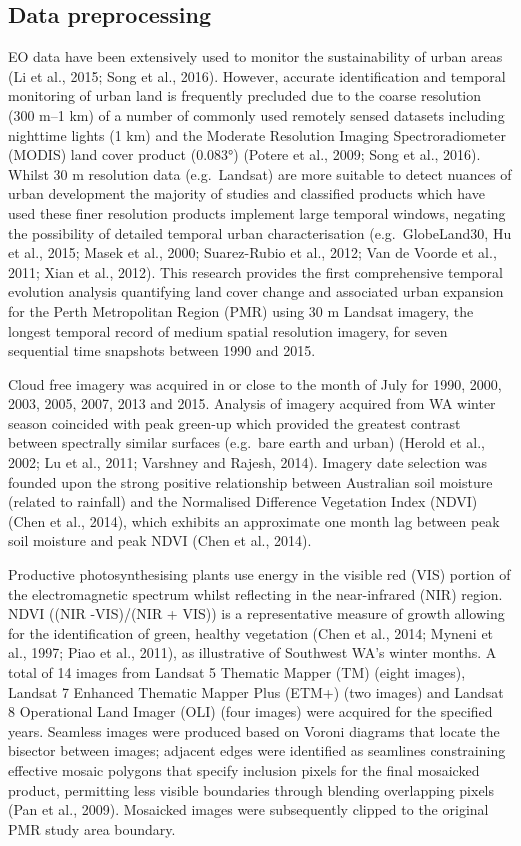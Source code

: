 \documentclass[]{book}
\begin{document}
\subsection{Data preprocessing}\label{data-preprocessing}

EO data have been extensively used to monitor the sustainability of
urban areas (Li et al., 2015; Song et al., 2016). However, accurate
identification and temporal monitoring of urban land is frequently
precluded due to the coarse resolution (300 m--1 km) of a number of
commonly used remotely sensed datasets including nighttime lights (1 km)
and the Moderate Resolution Imaging Spectroradiometer (MODIS) land cover
product (0.083°) (Potere et al., 2009; Song et al., 2016). Whilst 30 m
resolution data (e.g.~Landsat) are more suitable to detect nuances of
urban development the majority of studies and classified products which
have used these finer resolution products implement large temporal
windows, negating the possibility of detailed temporal urban
characterisation (e.g.~GlobeLand30, Hu et al., 2015; Masek et al., 2000;
Suarez-Rubio et al., 2012; Van de Voorde et al., 2011; Xian et al.,
2012). This research provides the first comprehensive temporal evolution
analysis quantifying land cover change and associated urban expansion
for the Perth Metropolitan Region (PMR) using 30 m Landsat imagery, the
longest temporal record of medium spatial resolution imagery, for seven
sequential time snapshots between 1990 and 2015.

Cloud free imagery was acquired in or close to the month of July for
1990, 2000, 2003, 2005, 2007, 2013 and 2015. Analysis of imagery
acquired from WA winter season coincided with peak green-up which
provided the greatest contrast between spectrally similar surfaces
(e.g.~bare earth and urban) (Herold et al., 2002; Lu et al., 2011;
Varshney and Rajesh, 2014). Imagery date selection was founded upon the
strong positive relationship between Australian soil moisture (related
to rainfall) and the Normalised Difference Vegetation Index (NDVI) (Chen
et al., 2014), which exhibits an approximate one month lag between peak
soil moisture and peak NDVI (Chen et al., 2014).

Productive photosynthesising plants use energy in the visible red (VIS)
portion of the electromagnetic spectrum whilst reflecting in the
near-infrared (NIR) region. NDVI ((NIR -VIS)/(NIR + VIS)) is a
representative measure of growth allowing for the identification of
green, healthy vegetation (Chen et al., 2014; Myneni et al., 1997; Piao
et al., 2011), as illustrative of Southwest WA's winter months. A total
of 14 images from Landsat 5 Thematic Mapper (TM) (eight images), Landsat
7 Enhanced Thematic Mapper Plus (ETM+) (two images) and Landsat 8
Operational Land Imager (OLI) (four images) were acquired for the
specified years. Seamless images were produced based on Voroni diagrams
that locate the bisector between images; adjacent edges were identified
as seamlines constraining effective mosaic polygons that specify
inclusion pixels for the final mosaicked product, permitting less
visible boundaries through blending overlapping pixels (Pan et al.,
2009). Mosaicked images were subsequently clipped to the original PMR
study area boundary.
\end{document}
